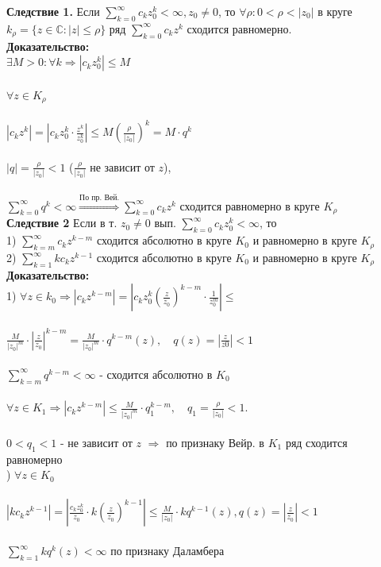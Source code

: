 \documentclass[a4paper,12pt]{article} %
\begin{document}
\textbf{Следствие 1. } Если $\sum\limits_{k = 0}^\infty c_k z_0^k < \infty, z_0 \neq 0$, то $\forall \rho: 0 < \rho < |z_0|$ в круге $k_{\rho} = \{z \in \mathbb{C} : |z| \leqslant \rho \} \text{ ряд } \sum\limits_{k = 0}^\infty c_k z^k$ сходится равномерно. \\

\textbf{Доказательство:} \\
$
\exists M > 0: \forall k \Rightarrow |c_k z_0^k| \leqslant M
$ \\
\ \\
$ \forall z \in K_{\rho} $\\
\ \\
$
|c_k z^k| = |c_k z_0^k \cdot \frac{z^k}{z_0^k} | \leqslant M \left( \frac{\rho}{|z_0|} \right)^k = M \cdot q^k
$ \\
\ \\
$ |q| = \frac{\rho}{|z_0|} < 1 $ ($\frac{\rho}{|z_0|}$ не зависит от $z$), \\
\ \\
$\sum\limits_{k = 0}^\infty q^k < \infty \stackrel{\text{По пр. Вей.}}{\Rightarrow} \sum\limits_{k = 0}^\infty c_k z^k$ сходится равномерно в круге  $K_{\rho}$ \\

\textbf{Следствие 2} Если в т. $z_0 \neq 0 $ вып. $\sum\limits_{k = 0}^\infty c_k z_0^k < \infty $, то \\
1) $\sum\limits_{k = m}^\infty c_k z^{k - m}$ сходится абсолютно в круге $K_0$ и равномерно в круге $K_{\rho}$ \\
2) $\sum\limits_{k = 1}^\infty k c_k z^{k - 1}$ сходится абсолютно в круге $K_0$ и равномерно в круге $K_{\rho}$ \\

\textbf{Доказательство:} \\
1) $\forall z \in k_0 \Rightarrow |c_k z^{k - m} | = |c_k z_0^k \left(\frac{z}{z_0} \right)^{k - m} \cdot \frac{1}{z_0^m} | \leqslant$ \\
\ \\
$
 \frac{M}{|z_0|^m} \cdot | \frac{z}{z_0} |^{k-m} = \frac{M}{|z_0|^m} \cdot q^{k - m} (z), \quad q(z) = |\frac{z}{z0}| < 1
$\\
\ \\
$\sum\limits_{k = m}^\infty q^{k - m} < \infty $ - сходится абсолютно в $K_0$\\
\ \\
$ \forall z \in K_1 \Rightarrow |c_k z^{k - m}| \leqslant \frac{M}{|z_0|^m} \cdot q_1^{k - m}, \quad q_1 = \frac{\rho}{|z_0|} < 1.
$\\
\ \\
$0 < q_1 < 1$ - не зависит от $z$ $\Rightarrow$ по признаку Вейр. в $K_1$ ряд сходится равномерно\\
) $\forall z \in K_0$ \\
\ \\
$ |k c_k z^{k-1} | = | \frac{c_k z_0^k}{z_0} \cdot k\left( \frac{z}{z_0} \right)^{k-1} | \leqslant \frac{M}{|z_0|} \cdot  k q^{k - 1}(z), q(z) = | \frac{z}{z_0} | < 1 $ \\
\ \\
$ \sum\limits_{k = 1}^\infty k q^k(z) < \infty $ по признаку Даламбера\\
\end{document}
